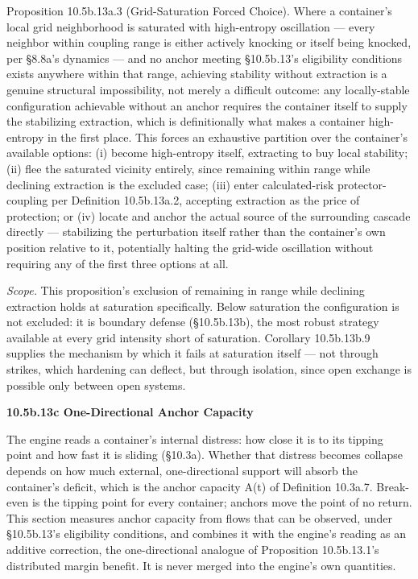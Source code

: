 \documentclass[
]{article}
\begin{document}
Proposition 10.5b.13a.3 (Grid-Saturation Forced Choice). Where a
container's local grid neighborhood is saturated with high-entropy
oscillation --- every neighbor within coupling range is either actively
knocking or itself being knocked, per §8.8a's dynamics --- and no anchor
meeting §10.5b.13's eligibility conditions exists anywhere within that
range, achieving stability without extraction is a genuine structural
impossibility, not merely a difficult outcome: any locally-stable
configuration achievable without an anchor requires the container itself
to supply the stabilizing extraction, which is definitionally what makes
a container high-entropy in the first place. This forces an exhaustive
partition over the container's available options: (i) become
high-entropy itself, extracting to buy local stability; (ii) flee the
saturated vicinity entirely, since remaining within range while
declining extraction is the excluded case; (iii) enter calculated-risk
protector-coupling per Definition 10.5b.13a.2, accepting extraction as
the price of protection; or (iv) locate and anchor the actual source of
the surrounding cascade directly --- stabilizing the perturbation itself
rather than the container's own position relative to it, potentially
halting the grid-wide oscillation without requiring any of the first
three options at all.

\emph{Scope.} This proposition's exclusion of remaining in range while
declining extraction holds at saturation specifically. Below saturation
the configuration is not excluded: it is boundary defense (§10.5b.13b),
the most robust strategy available at every grid intensity short of
saturation. Corollary 10.5b.13b.9 supplies the mechanism by which it
fails at saturation itself --- not through strikes, which hardening can
deflect, but through isolation, since open exchange is possible only
between open systems.

\textbf{10.5b.13c One-Directional Anchor Capacity}

The engine reads a container's internal distress: how close it is to its
tipping point and how fast it is sliding (§10.3a). Whether that distress
becomes collapse depends on how much external, one-directional support
will absorb the container's deficit, which is the anchor capacity A(t)
of Definition 10.3a.7. Break-even is the tipping point for every
container; anchors move the point of no return. This section measures
anchor capacity from flows that can be observed, under §10.5b.13's
eligibility conditions, and combines it with the engine's reading as an
additive correction, the one-directional analogue of Proposition
10.5b.13.1's distributed margin benefit. It is never merged into the
engine's own quantities.
\end{document}
